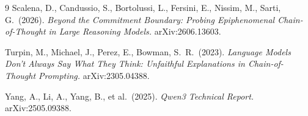 \documentclass[11pt]{article}
\begin{document}
\begin{thebibliography}{9}
Scalena, D., Candussio, S., Bortolussi, L., Fersini, E., Nissim, M.,
Sarti, G.\ (2026). \emph{Beyond the Commitment Boundary: Probing
Epiphenomenal Chain-of-Thought in Large Reasoning Models.}
arXiv:2606.13603.

Turpin, M., Michael, J., Perez, E., Bowman, S.~R.\ (2023).
\emph{Language Models Don't Always Say What They Think: Unfaithful
Explanations in Chain-of-Thought Prompting.} arXiv:2305.04388.

Yang, A., Li, A., Yang, B., et al.\ (2025). \emph{Qwen3 Technical Report.}
arXiv:2505.09388.

\end{thebibliography}
\end{document}
